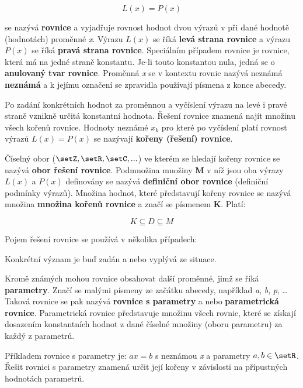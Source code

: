 $$ L(x) = P(x) $$

se nazývá {\bf rovnice} a vyjadřuje rovnost hodnot dvou výrazů v při dané hodnotě (hodnotách) proměnné {\it x}. Výrazu $L(x)$ se říká {\bf levá strana rovnice} a výrazu $P(x)$ se říká {\bf pravá strana rovnice}. Speciálním případem rovnice je rovnice, která má na jedné straně konstantu. Je-li touto konstantou nula, jedná se o {\bf anulovaný tvar rovnice}. Proměnná {\it x} se v kontextu rovnic nazývá neznámá {\bf neznámá} a k jejímu označení se zpravidla používají písmena z konce abecedy.

Po zadání konkrétních hodnot za proměnnou a vyčíslení výrazu na levé i pravé straně vznikně určitá konstantní hodnota. Řešení rovnice znamená najít množinu všech kořenů rovnice. Hodnoty neznámé $x_k$ pro které po vyčíslení platí rovnost výrazů $L(x) = P(x)$ se nazývají {\bf kořeny (řešení) rovnice}.

Číselný obor ($\setZ,\setR,\setC, ...$) ve kterém se hledají kořeny rovnice se nazývá {\bf obor řešení rovnice}. Podmnožina množiny {\bf M} v níž jsou oba výrazy $L(x)$ a $P(x)$ definovány se nazývá {\bf definiční obor rovnice} (definiční podmínky výrazů). Množina hodnot, které představují kořeny rovnice se nazývá množina {\bf množina kořenů rovnice} a značí se písmenem {\bf K}. Platí:

$$ K \subseteq D \subseteq M $$

Pojem řešení rovnice se používá v několika případech:

\vskip 4mm
\vskip 4mm

Konkrétní význam je buď zadán a nebo vyplývá ze situace.


Kromě známých mohou rovnice obsahovat další proměnné, jimž se říká {\bf parametry}. Značí se malými písmeny ze začátku abecedy, například {\it a}, {\it b}, {\it p}, … Taková rovnice se pak nazývá {\bf rovnice s parametry} a nebo  {\bf parametrická rovnice}. Parametrická rovnice představuje množinu všech rovnic, které se získají dosazením konstantních hodnot z dané číselné množiny (oboru parametru) za každý z parametrů.

Příkladem rovnice s parametry je: $ax = b$ s neznámou {\it x} a parametry $a, b \in \setR$. Řešit rovnici s parametry znamená určit její kořeny v závislosti na přípustných hodnotách parametrů.


